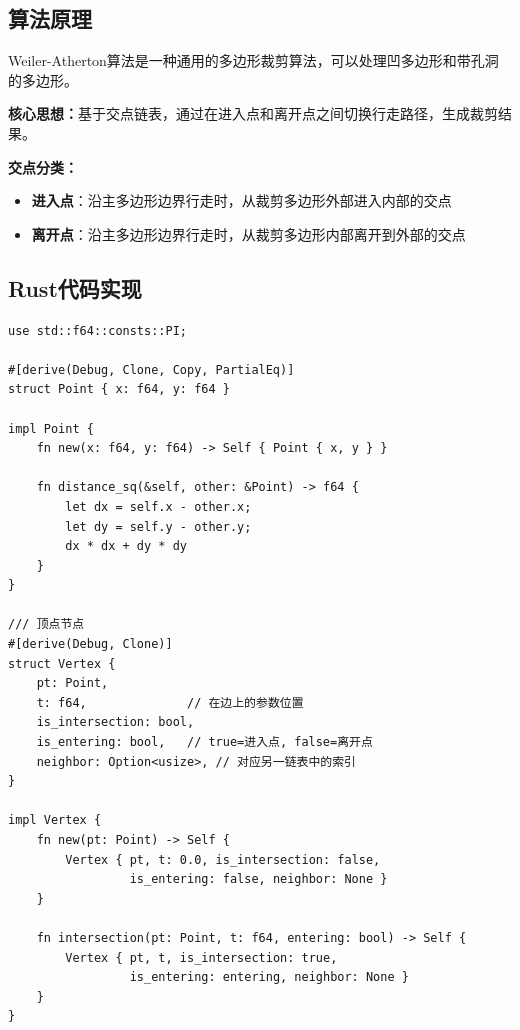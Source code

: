 \documentclass[12pt,a4paper]{article}
\begin{document}
\subsection{算法原理}
Weiler-Atherton算法是一种通用的多边形裁剪算法，可以处理凹多边形和带孔洞的多边形。

\textbf{核心思想：}基于交点链表，通过在进入点和离开点之间切换行走路径，生成裁剪结果。

\textbf{交点分类：}
\begin{itemize}
    \item \textbf{进入点}：沿主多边形边界行走时，从裁剪多边形外部进入内部的交点
    \item \textbf{离开点}：沿主多边形边界行走时，从裁剪多边形内部离开到外部的交点
\end{itemize}

\subsection{Rust代码实现}

\begin{lstlisting}
use std::f64::consts::PI;

#[derive(Debug, Clone, Copy, PartialEq)]
struct Point { x: f64, y: f64 }

impl Point {
    fn new(x: f64, y: f64) -> Self { Point { x, y } }
    
    fn distance_sq(&self, other: &Point) -> f64 {
        let dx = self.x - other.x;
        let dy = self.y - other.y;
        dx * dx + dy * dy
    }
}

/// 顶点节点
#[derive(Debug, Clone)]
struct Vertex {
    pt: Point,
    t: f64,              // 在边上的参数位置
    is_intersection: bool,
    is_entering: bool,   // true=进入点, false=离开点
    neighbor: Option<usize>, // 对应另一链表中的索引
}

impl Vertex {
    fn new(pt: Point) -> Self {
        Vertex { pt, t: 0.0, is_intersection: false, 
                 is_entering: false, neighbor: None }
    }
    
    fn intersection(pt: Point, t: f64, entering: bool) -> Self {
        Vertex { pt, t, is_intersection: true, 
                 is_entering: entering, neighbor: None }
    }
}
\end{lstlisting}
\end{document}
